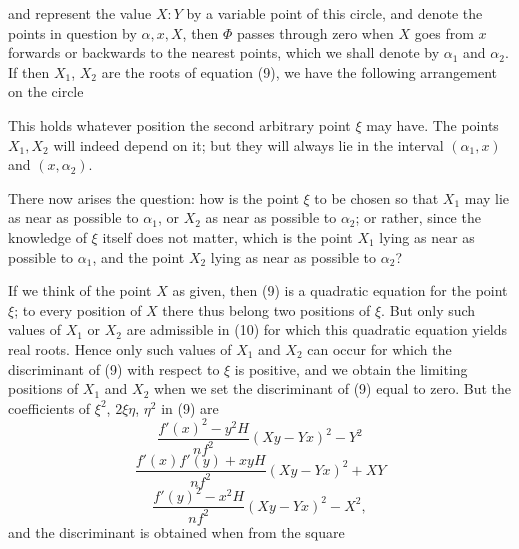 and represent the value $X:Y$ by a variable point of this circle,
and denote the points in question by $\alpha, x, X$, then
$\Phi$ passes through zero when $X$ goes from $x$ forwards or
backwards to the nearest points, which we shall denote by $\alpha_1$ and
$\alpha_2$. If then $X_1$, $X_2$ are the roots of
equation (9), we have the following arrangement on the circle



This holds whatever position the second arbitrary point $\xi$
may have. The points $X_1, X_2$ will indeed depend
on it; but they will always lie in the interval $(\alpha_1, x)$ and $(x, \alpha_2)$.

There now arises the question: how is the point $\xi$ to be chosen so that
$X_1$ may lie as near as possible to $\alpha_1$, or $X_2$ as near as possible to $\alpha_2$;
or rather, since the knowledge of $\xi$ itself does not matter,
which is the point $X_1$ lying as near as possible to $\alpha_1$, and the
point $X_2$ lying as near as possible to $\alpha_2$?

If we think of the point $X$ as given, then (9) is a
quadratic equation for the point $\xi$; to every position of $X$
there thus belong two positions of $\xi$. But only such values of
$X_1$ or $X_2$ are admissible in (10) for which this quadratic
equation yields real roots. Hence only such values of
$X_1$ and $X_2$ can occur for which the discriminant of
(9) with respect to $\xi$ is positive, and we obtain the limiting positions
of $X_1$ and $X_2$ when we set the discriminant of (9) equal to
zero. But the coefficients of $\xi^2$, $2\xi\eta$, $\eta^2$ in (9) are
\[
\frac{f'(x)^2 - y^2 H}{nf^2}(Xy - Yx)^2 - Y^2
\]
\[
\frac{f'(x)f'(y) + xyH}{nf^2}(Xy - Yx)^2 + XY
\]
\[
\frac{f'(y)^2 - x^2 H}{nf^2}(Xy - Yx)^2 - X^2,
\]
and the discriminant is obtained when from the square
